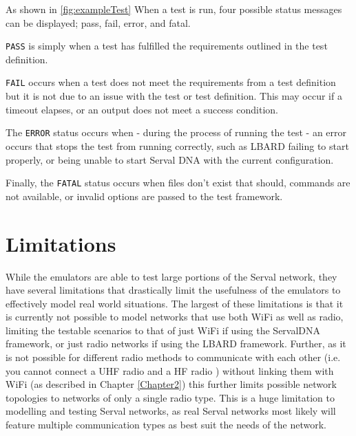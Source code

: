 As shown in \figurename{ \ref{fig:exampleTest}} When a test is run, four possible status messages can be displayed; pass, fail, error, and fatal.
\begin{list}{}{}
    \item \texttt{PASS} is simply when a test has fulfilled the requirements outlined in the test definition.

    \item \texttt{FAIL} occurs when a test does not meet the requirements from a test definition but it is not due to an issue with the test or test definition. This may occur if a timeout elapses, or an output does not meet a success condition.
    
    \item The \texttt{ERROR} status occurs when - during the process of running the test - an error occurs that stops the test from running correctly, such as LBARD failing to start properly, or being unable to start Serval DNA with the current configuration.
    
    \item Finally, the \texttt{FATAL} status occurs when files don't exist that should, commands are not available, or invalid options are passed to the test framework.    
\end{list}




\section{Limitations}
While the emulators are able to test large portions of the Serval network, they have several limitations that drastically limit the usefulness of the emulators to effectively model real world situations.
The largest of these limitations is that it is currently not possible to model networks that use both WiFi as well as radio, limiting the testable scenarios to that of just WiFi if using the ServalDNA framework, or just radio networks if using the LBARD framework.
Further, as it is not possible for different radio methods to communicate with each other (i.e. you cannot connect a UHF radio and a HF radio ) without linking them with WiFi (as described in Chapter \ref{Chapter2}) this further limits possible network topologies to networks of only a single radio type.
This is a huge limitation to modelling and testing Serval networks, as real Serval networks most likely will feature multiple communication types as best suit the needs of the network.

